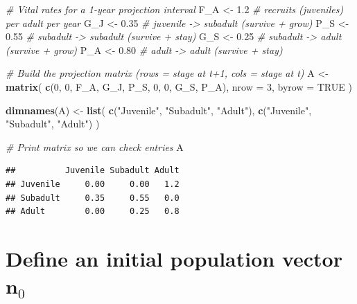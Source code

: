 \documentclass[
  a4paper]{book}
\newenvironment{Shaded}{\begin{snugshade}}{\end{snugshade}}
\newcommand{\AttributeTok}[1]{\textcolor[rgb]{0.13,0.29,0.53}{#1}}
\newcommand{\CommentTok}[1]{\textcolor[rgb]{0.56,0.35,0.01}{\textit{#1}}}
\newcommand{\ConstantTok}[1]{\textcolor[rgb]{0.56,0.35,0.01}{#1}}
\newcommand{\DecValTok}[1]{\textcolor[rgb]{0.00,0.00,0.81}{#1}}
\newcommand{\FloatTok}[1]{\textcolor[rgb]{0.00,0.00,0.81}{#1}}
\newcommand{\FunctionTok}[1]{\textcolor[rgb]{0.13,0.29,0.53}{\textbf{#1}}}
\newcommand{\NormalTok}[1]{#1}
\newcommand{\OtherTok}[1]{\textcolor[rgb]{0.56,0.35,0.01}{#1}}
\newcommand{\StringTok}[1]{\textcolor[rgb]{0.31,0.60,0.02}{#1}}
\begin{document}
\begin{Shaded}
\begin{Highlighting}[]
\CommentTok{\# Vital rates for a 1{-}year projection interval}
\NormalTok{F\_A }\OtherTok{\textless{}{-}} \FloatTok{1.2}   \CommentTok{\# recruits (juveniles) per adult per year}
\NormalTok{G\_J }\OtherTok{\textless{}{-}} \FloatTok{0.35}  \CommentTok{\# juvenile {-}\textgreater{} subadult (survive + grow)}
\NormalTok{P\_S }\OtherTok{\textless{}{-}} \FloatTok{0.55}  \CommentTok{\# subadult {-}\textgreater{} subadult (survive + stay)}
\NormalTok{G\_S }\OtherTok{\textless{}{-}} \FloatTok{0.25}  \CommentTok{\# subadult {-}\textgreater{} adult (survive + grow)}
\NormalTok{P\_A }\OtherTok{\textless{}{-}} \FloatTok{0.80}  \CommentTok{\# adult {-}\textgreater{} adult (survive + stay)}

\CommentTok{\# Build the projection matrix (rows = stage at t+1, cols = stage at t)}
\NormalTok{A }\OtherTok{\textless{}{-}} \FunctionTok{matrix}\NormalTok{(}
  \FunctionTok{c}\NormalTok{(}\DecValTok{0}\NormalTok{,   }\DecValTok{0}\NormalTok{,   F\_A,}
\NormalTok{    G\_J, P\_S, }\DecValTok{0}\NormalTok{,}
    \DecValTok{0}\NormalTok{,   G\_S, P\_A),}
  \AttributeTok{nrow =} \DecValTok{3}\NormalTok{, }\AttributeTok{byrow =} \ConstantTok{TRUE}
\NormalTok{)}

\FunctionTok{dimnames}\NormalTok{(A) }\OtherTok{\textless{}{-}} \FunctionTok{list}\NormalTok{(}
  \FunctionTok{c}\NormalTok{(}\StringTok{"Juvenile"}\NormalTok{, }\StringTok{"Subadult"}\NormalTok{, }\StringTok{"Adult"}\NormalTok{),}
  \FunctionTok{c}\NormalTok{(}\StringTok{"Juvenile"}\NormalTok{, }\StringTok{"Subadult"}\NormalTok{, }\StringTok{"Adult"}\NormalTok{)}
\NormalTok{)}

\CommentTok{\# Print matrix so we can check entries}
\NormalTok{A}
\end{Highlighting}
\end{Shaded}

\begin{verbatim}
##          Juvenile Subadult Adult
## Juvenile     0.00     0.00   1.2
## Subadult     0.35     0.55   0.0
## Adult        0.00     0.25   0.8
\end{verbatim}

\section{\texorpdfstring{Define an initial population vector \(\mathbf{n}_0\)}{Define an initial population vector \textbackslash mathbf\{n\}\_0}}\label{define-an-initial-population-vector-mathbfn_0}
\end{document}
